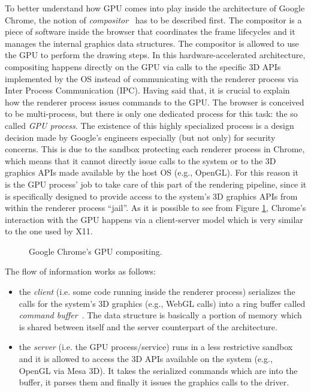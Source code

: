 To better understand how GPU comes into play inside the architecture of Google
Chrome, the notion of \emph{compositor}~\cite{gpucompositing} has to be described first.
The compositor is a piece of software inside the browser that coordinates the frame
lifecycles and it manages the internal graphics data structures. The compositor
is allowed to use the GPU to perform the drawing steps. In this hardware-accelerated
architecture, compositing happens directly on the GPU via calls to the specific 3D
APIs implemented by the OS instead of communicating with the renderer process via
Inter Process Communication (IPC).
Having said that, it is crucial to explain how the renderer process issues
commands to the GPU. The browser is conceived to be multi-process, but
there is only one dedicated process for this task: the so called \emph{GPU process}.
The existence of this highly specialized process is a design decision made by Google's
engineers especially (but not only) for security concerns. This is due to the
sandbox protecting each renderer process in Chrome, which means that it cannot
directly issue calls to the system or to the 3D graphics APIs
made available by the host OS (e.g., OpenGL). For this reason it is the GPU process' job
to take care of this part of the rendering pipeline, since it is specifically
designed to provide access to the system's 3D graphics APIs from within the renderer
process ``jail''.
As it is possible to see from Figure \ref{img:chrome_gpu_compositing}, Chrome's
interaction with the GPU happens via a client-server model which is very similar
to the one used by X11.
\begin{figure}[!htb]
    \caption{Google Chrome's GPU compositing.}
    \label{img:chrome_gpu_compositing}
\end{figure}

The flow of information works as follows:
\begin{itemize}
    \item the \emph{client} (i.e. some code running inside the renderer process) serializes
        the calls for the system's 3D graphics (e.g., WebGL calls) into a ring buffer called
        \emph{command buffer}~\cite{gpucommandbffer}. The data structure is basically a
        portion of memory which is shared between itself and the server counterpart of
        the architecture.
    \item the \emph{server} (i.e. the GPU process/service) runs in a less restrictive sandbox
        and it is allowed to access the 3D APIs available on the system (e.g., OpenGL via Mesa 3D).
        It takes the serialized commands which are into the buffer, it parses them and finally
        it issues the graphics calls to the driver.
\end{itemize}

